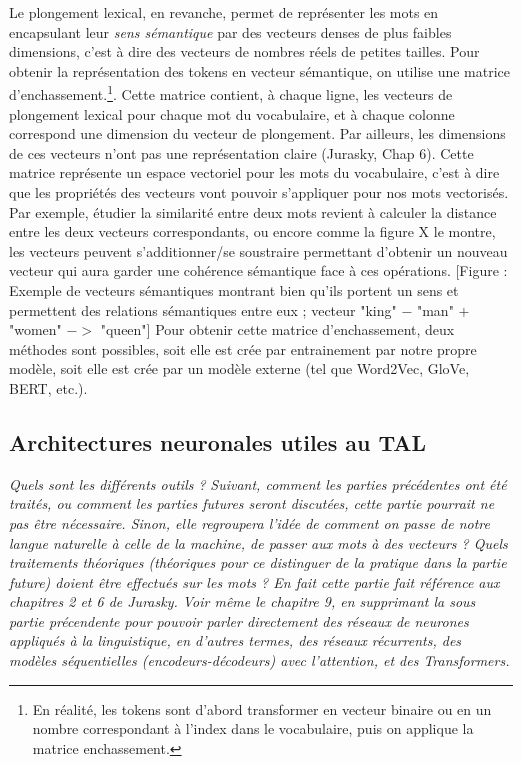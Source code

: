 \documentclass[12pt, french]{report}
\begin{document}
Le plongement lexical, en revanche, permet de représenter les mots en encapsulant leur \textit{sens sémantique} par des vecteurs denses de plus faibles dimensions, c'est à dire des vecteurs de nombres réels de petites tailles. Pour obtenir la représentation des tokens en vecteur sémantique, on utilise une matrice d'enchassement.\footnote{En réalité, les tokens sont d'abord transformer en vecteur binaire ou en un nombre correspondant à l'index dans le vocabulaire, puis on applique la matrice enchassement.}. Cette matrice contient, à chaque ligne, les vecteurs de plongement lexical pour chaque mot du vocabulaire, et à chaque colonne correspond une dimension du vecteur de plongement. Par ailleurs, les dimensions de ces vecteurs n'ont pas une représentation claire (Jurasky, Chap 6). Cette matrice représente un espace vectoriel pour les mots du vocabulaire, c'est à dire que les propriétés des vecteurs vont pouvoir s'appliquer pour nos mots vectorisés. Par exemple, étudier la similarité entre deux mots revient à calculer la distance entre les deux vecteurs correspondants, ou encore comme la figure X le montre, les vecteurs peuvent s'additionner/se soustraire permettant d'obtenir un nouveau vecteur qui aura garder une cohérence sémantique face à ces opérations. [Figure : Exemple de vecteurs sémantiques montrant bien qu'ils portent un sens et permettent des relations sémantiques entre eux ; vecteur "king" $-$ "man" $+$ "women" $->$ "queen"] Pour obtenir cette matrice d'enchassement, deux méthodes sont possibles, soit elle est crée par entrainement par notre propre modèle, soit elle est crée par un modèle externe (tel que Word2Vec, GloVe, BERT, etc.).


\subsection{Architectures neuronales utiles au TAL}
\textit{Quels sont les différents outils ?}
\textit{Suivant, comment les parties précédentes ont été traités, ou comment les parties futures seront discutées, cette partie pourrait ne pas être nécessaire. Sinon, elle regroupera l'idée de comment on passe de notre langue naturelle à celle de la machine, de passer aux mots à des vecteurs ? Quels traitements théoriques (théoriques pour ce distinguer de la pratique dans la partie future) doient être effectués sur les mots ? En fait cette partie fait référence aux chapitres 2 et 6 de Jurasky. Voir même le chapitre 9, en supprimant la sous partie précendente pour pouvoir parler directement des réseaux de neurones appliqués à la linguistique, en d'autres termes, des réseaux récurrents, des modèles séquentielles (encodeurs-décodeurs) avec l'attention, et des Transformers.}\\
\end{document}
